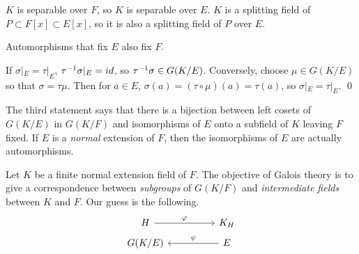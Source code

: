 \pf {} \(K\) is separable over \(F\), so \(K\) is separable over \(E\). \(K\) is a splitting field of \(P \subset F[x] \subset E[x]\), so it is also a splitting field of \(P\) over \(E\).

 Automorphisms that fix \(E\) also fix \(F\).

 If \(\sigma |_E = \tau |_E\), \(\tau^{-1}\sigma|_E = id\), so \(\tau^{-1}\sigma \in G(K/E)\). Conversely, choose \(\mu \in G(K/E)\) so that \(\sigma = \tau\mu\). Then for \(a \in E\), \(\sigma(a) = (\tau\circ\mu)(a) = \tau(a)\), so \(\sigma |_E = \tau |_E\). \qed

The third statement says that there is a bijection between left cosets of \(G(K/E)\) in \(G(K/F)\) and isomorphisms of \(E\) onto a subfield of \(K\) leaving \(F\) fixed. If \(E\) is a \textit{normal} extension of \(F\), then the isomorphisms of \(E\) are actually automorphisms.

Let \(K\) be a finite normal extension field of \(F\). The objective of Galois theory is to give a correspondence between \textit{subgroups} of \(G(K/F)\) and \textit{intermediate fields} between \(K\) and \(F\). Our guess is the following.
\[
    \begin{tikzcd}[row sep=tiny]
        H \arrow{rr}{\varphi} && K_H \\
        G(K/E) && E \arrow{ll}[swap]{\psi}
    \end{tikzcd}
\]

\smallskip
